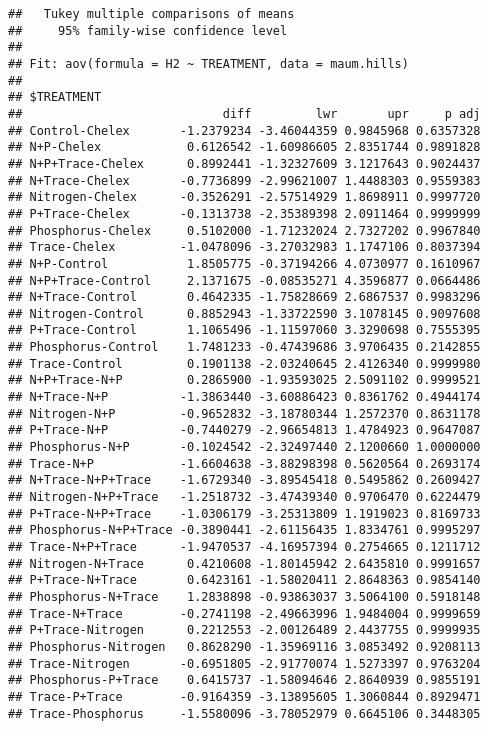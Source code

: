 \documentclass[]{article}
\begin{document}
\begin{verbatim}
##   Tukey multiple comparisons of means
##     95% family-wise confidence level
## 
## Fit: aov(formula = H2 ~ TREATMENT, data = maum.hills)
## 
## $TREATMENT
##                            diff         lwr       upr     p adj
## Control-Chelex       -1.2379234 -3.46044359 0.9845968 0.6357328
## N+P-Chelex            0.6126542 -1.60986605 2.8351744 0.9891828
## N+P+Trace-Chelex      0.8992441 -1.32327609 3.1217643 0.9024437
## N+Trace-Chelex       -0.7736899 -2.99621007 1.4488303 0.9559383
## Nitrogen-Chelex      -0.3526291 -2.57514929 1.8698911 0.9997720
## P+Trace-Chelex       -0.1313738 -2.35389398 2.0911464 0.9999999
## Phosphorus-Chelex     0.5102000 -1.71232024 2.7327202 0.9967840
## Trace-Chelex         -1.0478096 -3.27032983 1.1747106 0.8037394
## N+P-Control           1.8505775 -0.37194266 4.0730977 0.1610967
## N+P+Trace-Control     2.1371675 -0.08535271 4.3596877 0.0664486
## N+Trace-Control       0.4642335 -1.75828669 2.6867537 0.9983296
## Nitrogen-Control      0.8852943 -1.33722590 3.1078145 0.9097608
## P+Trace-Control       1.1065496 -1.11597060 3.3290698 0.7555395
## Phosphorus-Control    1.7481233 -0.47439686 3.9706435 0.2142855
## Trace-Control         0.1901138 -2.03240645 2.4126340 0.9999980
## N+P+Trace-N+P         0.2865900 -1.93593025 2.5091102 0.9999521
## N+Trace-N+P          -1.3863440 -3.60886423 0.8361762 0.4944174
## Nitrogen-N+P         -0.9652832 -3.18780344 1.2572370 0.8631178
## P+Trace-N+P          -0.7440279 -2.96654813 1.4784923 0.9647087
## Phosphorus-N+P       -0.1024542 -2.32497440 2.1200660 1.0000000
## Trace-N+P            -1.6604638 -3.88298398 0.5620564 0.2693174
## N+Trace-N+P+Trace    -1.6729340 -3.89545418 0.5495862 0.2609427
## Nitrogen-N+P+Trace   -1.2518732 -3.47439340 0.9706470 0.6224479
## P+Trace-N+P+Trace    -1.0306179 -3.25313809 1.1919023 0.8169733
## Phosphorus-N+P+Trace -0.3890441 -2.61156435 1.8334761 0.9995297
## Trace-N+P+Trace      -1.9470537 -4.16957394 0.2754665 0.1211712
## Nitrogen-N+Trace      0.4210608 -1.80145942 2.6435810 0.9991657
## P+Trace-N+Trace       0.6423161 -1.58020411 2.8648363 0.9854140
## Phosphorus-N+Trace    1.2838898 -0.93863037 3.5064100 0.5918148
## Trace-N+Trace        -0.2741198 -2.49663996 1.9484004 0.9999659
## P+Trace-Nitrogen      0.2212553 -2.00126489 2.4437755 0.9999935
## Phosphorus-Nitrogen   0.8628290 -1.35969116 3.0853492 0.9208113
## Trace-Nitrogen       -0.6951805 -2.91770074 1.5273397 0.9763204
## Phosphorus-P+Trace    0.6415737 -1.58094646 2.8640939 0.9855191
## Trace-P+Trace        -0.9164359 -3.13895605 1.3060844 0.8929471
## Trace-Phosphorus     -1.5580096 -3.78052979 0.6645106 0.3448305
\end{verbatim}
\end{document}
